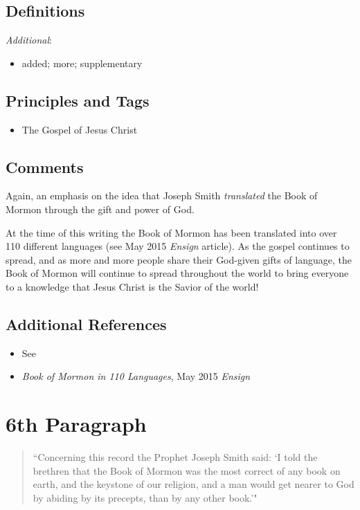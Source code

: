 \documentclass[12pt]{report}
\begin{document}
\subsection{Definitions\label{intro:DFN5}}
\emph{Additional}: \begin{itemize}
\item added; more; supplementary
\end{itemize}
\subsection{Principles and Tags\label{intro:principles5}}
\begin{itemize}
\item {} The Gospel of Jesus Christ
\end{itemize}

\subsection{Comments\label{intro:comments5}}
Again, an emphasis on the idea that Joseph Smith \emph{translated} the Book of Mormon through the gift and power of God.

At the time of this writing the Book of Mormon has been translated into over 110 different languages (see May 2015 \emph{Ensign} article).  As the gospel continues to spread, and as more and more people share their God-given gifts of language, the Book of Mormon will continue to spread throughout the world to bring everyone to a knowledge that Jesus Christ is the Savior of the world!

\subsection{Additional References\label{intro:references5}}
\begin{itemize}
\item See 
\item \emph{Book of Mormon in 110 Languages}, May 2015 \emph{Ensign}
\end{itemize}

\section{6th Paragraph\label{intro:6th}}
\begin{center}
\begin{quote}
``Concerning this record the Prophet Joseph Smith said: `I told the brethren that the Book of Mormon was the most correct of any book on earth, and the keystone of our religion, and a man would get nearer to God by abiding by its precepts, than by any other book.'"
\end{quote}
\end{center}
\end{document}
